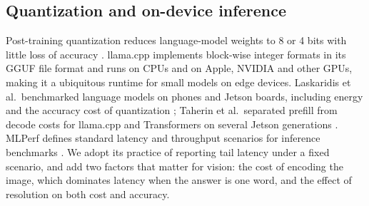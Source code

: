 \subsection{Quantization and on-device inference}
Post-training quantization reduces language-model weights to 8 or 4 bits with little loss of accuracy \cite{dettmers2022llmint8,frantar2023gptq,lin2024awq}. llama.cpp \cite{gerganov2023llamacpp} implements block-wise integer formats in its GGUF file format and runs on CPUs and on Apple, NVIDIA and other GPUs, making it a ubiquitous runtime for small models on edge devices. Laskaridis et al.\ benchmarked language models on phones and Jetson boards, including energy and the accuracy cost of quantization \cite{laskaridis2024melt}; Taherin et al.\ separated prefill from decode costs for llama.cpp and Transformers on several Jetson generations \cite{taherin2026hydra}. MLPerf defines standard latency and throughput scenarios for inference benchmarks \cite{reddi2020mlperf}. We adopt its practice of reporting tail latency under a fixed scenario, and add two factors that matter for vision: the cost of encoding the image, which dominates latency when the answer is one word, and the effect of resolution on both cost and accuracy.

